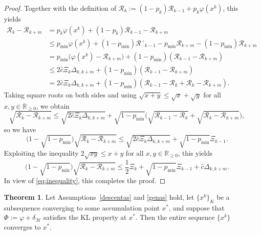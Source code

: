 \documentclass[a4paper, 12pt]{article}
\numberwithin{equation}{section}
\theoremstyle{bolddef}
\theoremstyle{definition}
\theoremstyle{boldplain}
\newtheorem{theorem}[definition]{Theorem}
\newcommand{\xk}{x^k}
\newcommand{\pmin}{p_{\min}}
\newcommand{\Rvalue}{\mathcal{R}}
\begin{document}
\begin{proof}
Together with the definition of $ \Rvalue_k := (1-p_k)\Rvalue_{k-1} + p_k \varphi(\xk) $, this yields
\begin{align*}
   \Rvalue_k - \Rvalue_{k+m} &= p_k \varphi(\xk) + (1-p_k) \Rvalue_{k-1} - \Rvalue_{k+m} \\
	& \leq \pmin \varphi(\xk) + (1-\pmin) \Rvalue´_{k-1} - \pmin \Rvalue_{k+m} - (1-\pmin) \Rvalue_{k+m}\\
	& = \pmin \big( \varphi(\xk) - \Rvalue_{k+m} \big) + (1-\pmin) (\Rvalue_{k-1} - \Rvalue_{k+m})\\
	& \leq 2\hat c \Xi_k \Delta_{k, k+m}  + (1-\pmin) (\Rvalue_{k-1} - \Rvalue_{k+m})\\
	& = 2\hat c \Xi_k \Delta_{k, k+m}  + (1-\pmin) (\Rvalue_{k-1} - \Rvalue_k + \Rvalue_k - \Rvalue_{k+m}).
\end{align*}
Taking square roots on both sides and using
$\sqrt{x+y} \leq \sqrt{x} + \sqrt{y}$ for all $ x, y \in \mathbb{R}_{\geq 0}$, we obtain
\begin{equation*}
	\sqrt{\Rvalue_k - \Rvalue_{k+m}}
	\leq \sqrt{2 \hat{c} \Xi_k \Delta_{k,k+m}} +
	\sqrt{1 - \pmin} \big( \sqrt{\Rvalue_{k-1} - \Rvalue_k} 
	+ \sqrt{\Rvalue_k - \Rvalue_{k+m}} \big),
\end{equation*}
so we have
\begin{equation*}
   \big( 1 - \sqrt{1 - \pmin} \big) \sqrt{\Rvalue_k - \Rvalue_{k+m}}
   \leq \sqrt{2 \hat{c} \Xi_k \Delta_{k,k+m}} +
   \sqrt{1 - \pmin} \Xi_{k-1}.
\end{equation*}
Exploiting the inequality $2\sqrt{xy} \leq x+y$ for all $x, y \in \mathbb{R}_{\geq 0}$, this yields
\begin{equation*}
   \big( 1-\sqrt{1-\pmin} \big) 
   \sqrt{\Rvalue_k - \Rvalue_{k+m}} \leq 
	\frac{1}{2} \Xi_k + \sqrt{1-\pmin} \Xi_{k-1} + \hat c \Delta_{k, k+m}.
\end{equation*}
In view of \eqref{eq:inequality}, this completes the proof.
\end{proof}

\begin{theorem}\label{thm:convergenceproof}
Let Assumptions~\ref{descentas} and \ref{genas} hold, let $\{\xk\}_K$ be a subsequence converging to some accumulation point $x^*$, and suppose that $\Phi:= \varphi + \delta_\mathcal{M}$ satisfies the KL property at $x^*$. Then the entire sequence $\{\xk\}$ converges to $x^*$.
\end{theorem}
\end{document}
